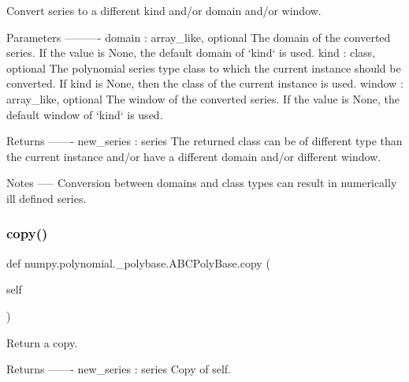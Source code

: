 \begin{DoxyVerb}Convert series to a different kind and/or domain and/or window.

Parameters
----------
domain : array_like, optional
    The domain of the converted series. If the value is None,
    the default domain of `kind` is used.
kind : class, optional
    The polynomial series type class to which the current instance
    should be converted. If kind is None, then the class of the
    current instance is used.
window : array_like, optional
    The window of the converted series. If the value is None,
    the default window of `kind` is used.

Returns
-------
new_series : series
    The returned class can be of different type than the current
    instance and/or have a different domain and/or different
    window.

Notes
-----
Conversion between domains and class types can result in
numerically ill defined series.\end{DoxyVerb}
 \mbox{\label{classnumpy_1_1polynomial_1_1__polybase_1_1ABCPolyBase_ae2f23cf249babe82bc2bf0c6d1d94f27}} 
\subsubsection{\texorpdfstring{copy()}{copy()}}
{\footnotesize\ttfamily def numpy.\+polynomial.\+\_\+polybase.\+A\+B\+C\+Poly\+Base.\+copy (\begin{DoxyParamCaption}\item[{}]{self }\end{DoxyParamCaption})}

\begin{DoxyVerb}Return a copy.

Returns
-------
new_series : series
    Copy of self.\end{DoxyVerb}
 \mbox{\label{classnumpy_1_1polynomial_1_1__polybase_1_1ABCPolyBase_a1ee07290f873bc6a7def07110e6d204d}} 
